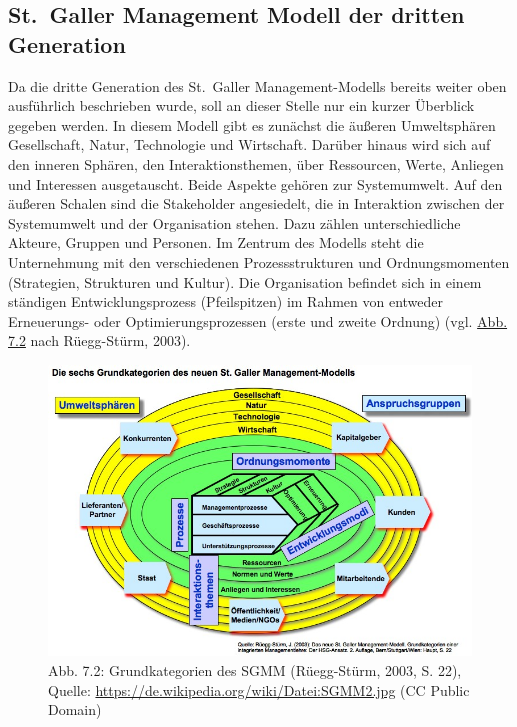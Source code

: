 \documentclass[
  letterpaper,
]{book}
\begin{document}
\subsection{St.~Galler Management Modell der dritten
Generation}\label{st-galler-management-modell-der-dritten-generation}

Da die dritte Generation des St.~Galler Management-Modells bereits
weiter oben ausführlich beschrieben wurde, soll an dieser Stelle nur ein
kurzer Überblick gegeben werden. In diesem Modell gibt es zunächst die
äußeren Umweltsphären Gesellschaft, Natur, Technologie und Wirtschaft.
Darüber hinaus wird sich auf den inneren Sphären, den
Interaktionsthemen, über Ressourcen, Werte, Anliegen und Interessen
ausgetauscht. Beide Aspekte gehören zur Systemumwelt. Auf den äußeren
Schalen sind die Stakeholder angesiedelt, die in Interaktion zwischen
der Systemumwelt und der Organisation stehen. Dazu zählen
unterschiedliche Akteure, Gruppen und Personen. Im Zentrum des Modells
steht die Unternehmung mit den verschiedenen Prozessstrukturen und
Ordnungsmomenten (Strategien, Strukturen und Kultur). Die Organisation
befindet sich in einem ständigen Entwicklungsprozess (Pfeilspitzen) im
Rahmen von entweder Erneuerungs- oder Optimierungsprozessen (erste und
zweite Ordnung) (vgl. \hyperref[figure72]{Abb. 7.2} nach Rüegg-Stürm,
2003).

\begin{figure}

\includegraphics[width=0.75\linewidth,height=\textheight,keepaspectratio]{images/figure72.jpeg} \hfill{}

\caption{Abb. 7.2: Grundkategorien des SGMM (Rüegg-Stürm, 2003, S. 22),
Quelle: \url{https://de.wikipedia.org/wiki/Datei:SGMM2.jpg} (CC Public
Domain)}

\end{figure}%
\end{document}
